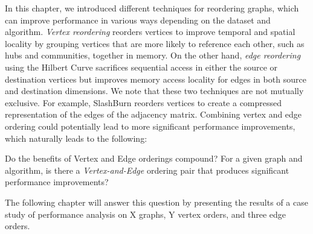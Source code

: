


In this chapter, we introduced different techniques for reordering graphs, which can improve performance in various ways depending on the dataset and algorithm. 
\textit{Vertex reordering} reorders vertices to improve temporal and spatial locality by grouping vertices that are more likely to reference each other, such as hubs and communities, together in memory. 
On the other hand, \textit{edge reordering} using the Hilbert Curve sacrifices sequential access in either the source or destination vertices but improves memory access locality for edges in both source and destination dimensions. 
We note that these two techniques are not mutually exclusive.
For example, SlashBurn reorders vertices to create a compressed representation of the edges of the adjacency matrix. Combining vertex and edge ordering could potentially lead to more significant performance improvements, which naturally leads to the following:

\begin{rquestion}
    Do the benefits of Vertex and Edge orderings compound? For a given graph and algorithm, is there a \textit{Vertex-and-Edge} ordering pair that produces significant performance improvements?  \label{rq:v_e_order_interaction}
\end{rquestion}
The following chapter will answer this question by presenting the results of a case study of performance analysis on X graphs, Y vertex orders, and three edge orders.



